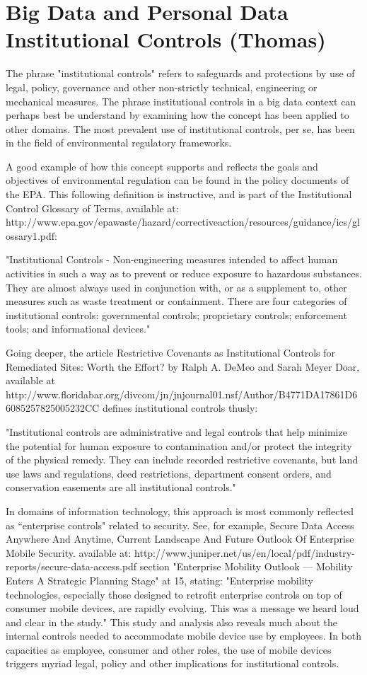 \section{Big Data and Personal Data Institutional Controls (Thomas)}

The phrase "institutional controls" refers to safeguards and protections by use of legal, policy, governance and other non-strictly technical, engineering or mechanical measures.
The phrase institutional controls in a big data context can perhaps best be understand by examining how the concept has been applied to other domains.
The most prevalent use of institutional controls, per se, has been in the field of environmental regulatory frameworks.

A good example of how this concept supports and reflects the goals and objectives of environmental regulation can be found in the policy documents of the EPA.
This following definition is instructive, and is part of the Institutional Control Glossary of Terms, available at: http://www.epa.gov/epawaste/hazard/correctiveaction/resources/guidance/ics/glossary1.pdf:

"Institutional Controls - Non-engineering measures intended to affect human activities in such a way as to prevent or reduce exposure to hazardous substances. They are almost always used in conjunction with, or as a supplement to, other measures such as waste treatment or containment. There are four categories of institutional controls: governmental controls; proprietary controls; enforcement tools; and informational devices."

Going deeper, the article Restrictive Covenants as Institutional Controls for Remediated Sites: Worth the Effort? by Ralph A. DeMeo and Sarah Meyer Doar, available at http://www.floridabar.org/divcom/jn/jnjournal01.nsf/Author/B4771DA17861D66085257825005232CC defines institutional controls thusly:

"Institutional controls are administrative and legal controls that help minimize the potential for human exposure to contamination and/or protect the integrity of the physical remedy. They can include recorded restrictive covenants, but land use laws and regulations, deed restrictions, department consent orders, and conservation easements are all institutional controls."

In domains of information technology, this approach is most commonly reflected as “enterprise controls" related to security.
See, for example, Secure Data Access Anywhere And Anytime, Current Landscape And Future Outlook Of Enterprise Mobile Security. available at: http://www.juniper.net/us/en/local/pdf/industry-reports/secure-data-access.pdf section "Enterprise Mobility Outlook — Mobility Enters A Strategic Planning Stage" at 15, stating: "Enterprise mobility technologies, especially those designed to retrofit enterprise controls on top of consumer mobile devices, are rapidly evolving. This was a message we heard loud and clear in the study."
This study and analysis also reveals much about the internal controls needed to accommodate mobile device use by employees.
In both capacities as employee, consumer and other roles, the use of mobile devices triggers myriad legal, policy and other implications for institutional controls.

